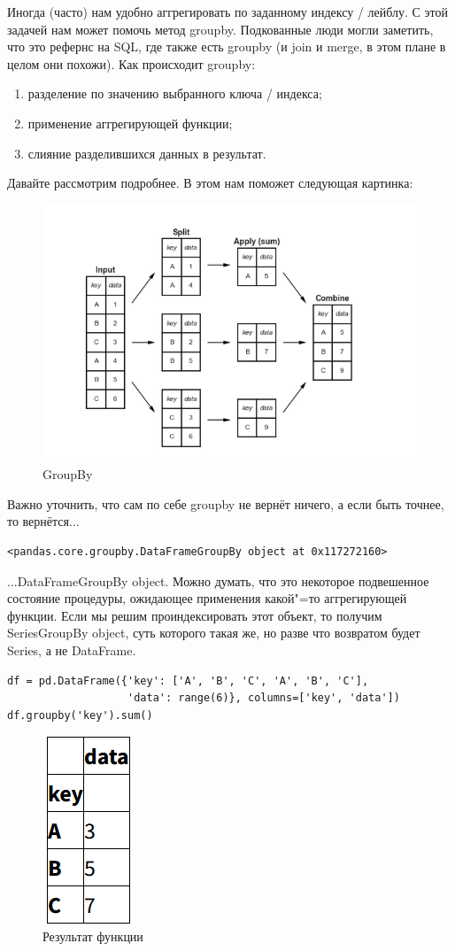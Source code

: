 \documentclass{article}
\begin{document}
Иногда (часто) нам удобно аггрегировать по заданному индексу / лейблу. С этой задачей нам может помочь метод groupby. Подкованные люди могли заметить, что это рефернс на SQL, где также есть groupby (и join и merge, в этом плане в целом они похожи). Как происходит groupby:
\begin{enumerate}
    \item разделение по значению выбранного ключа / индекса;
    \item применение аггрегирующей функции;
    \item слияние разделившихся данных в результат.
\end{enumerate}
Давайте рассмотрим подробнее. В этом нам поможет следующая картинка:
\begin{figure}[H]
    \centering
    \includegraphics[width=0.75\linewidth]{groupby_structure.png}
    \caption{GroupBy}
    \label{fig:enter-label}
\end{figure}

Важно уточнить, что сам по себе groupby не вернёт ничего, а если быть точнее, то вернётся...
\begin{verbatim}
<pandas.core.groupby.DataFrameGroupBy object at 0x117272160>
\end{verbatim}
...DataFrameGroupBy object. Можно думать, что это некоторое подвешенное состояние процедуры, ожидающее применения какой"=то аггрегирующей функции. Если мы решим проиндексировать этот объект, то получим SeriesGroupBy object, суть которого такая же, но разве что возвратом будет Series, а не DataFrame.
\begin{verbatim}
df = pd.DataFrame({'key': ['A', 'B', 'C', 'A', 'B', 'C'],
                   'data': range(6)}, columns=['key', 'data'])
df.groupby('key').sum()
\end{verbatim}
\begin{figure}[H]
    \centering
    \includegraphics[width=0.15\linewidth]{groupby_return.png}
    \caption{Результат функции}
    \label{fig:enter-label}
\end{figure}
\end{document}
